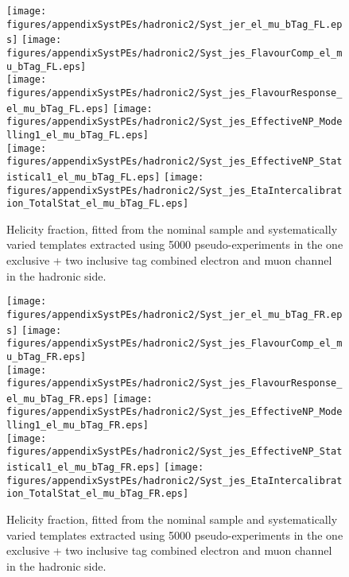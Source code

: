 \begin{figure}[!hb]
\begin{center}
        \texttt{[image: figures/appendixSystPEs/hadronic2/Syst\_jer\_el\_mu\_bTag\_FL.eps]}
        \texttt{[image: figures/appendixSystPEs/hadronic2/Syst\_jes\_FlavourComp\_el\_mu\_bTag\_FL.eps]}\\
        \texttt{[image: figures/appendixSystPEs/hadronic2/Syst\_jes\_FlavourResponse\_el\_mu\_bTag\_FL.eps]}
        \texttt{[image: figures/appendixSystPEs/hadronic2/Syst\_jes\_EffectiveNP\_Modelling1\_el\_mu\_bTag\_FL.eps]}\\
         \texttt{[image: figures/appendixSystPEs/hadronic2/Syst\_jes\_EffectiveNP\_Statistical1\_el\_mu\_bTag\_FL.eps]}
        \texttt{[image: figures/appendixSystPEs/hadronic2/Syst\_jes\_EtaIntercalibration\_TotalStat\_el\_mu\_bTag\_FL.eps]}
\caption{Helicity fraction, \fl fitted from the nominal \ttbar sample and systematically varied templates extracted using 5000 pseudo-experiments in the one exclusive + two inclusive \bt tag combined electron and muon channel in the hadronic side. }
\label{fig:systematicVar_lep_fL_elmu2incl_JERJES_1}
\end{center}
\end{figure}


\begin{figure}[!hb]
\begin{center}
        \texttt{[image: figures/appendixSystPEs/hadronic2/Syst\_jer\_el\_mu\_bTag\_FR.eps]}
        \texttt{[image: figures/appendixSystPEs/hadronic2/Syst\_jes\_FlavourComp\_el\_mu\_bTag\_FR.eps]}\\
        \texttt{[image: figures/appendixSystPEs/hadronic2/Syst\_jes\_FlavourResponse\_el\_mu\_bTag\_FR.eps]}
        \texttt{[image: figures/appendixSystPEs/hadronic2/Syst\_jes\_EffectiveNP\_Modelling1\_el\_mu\_bTag\_FR.eps]}\\
        \texttt{[image: figures/appendixSystPEs/hadronic2/Syst\_jes\_EffectiveNP\_Statistical1\_el\_mu\_bTag\_FR.eps]}
        \texttt{[image: figures/appendixSystPEs/hadronic2/Syst\_jes\_EtaIntercalibration\_TotalStat\_el\_mu\_bTag\_FR.eps]}
 
\caption{Helicity fraction, \fr fitted from the nominal \ttbar sample and systematically varied templates extracted using 5000 pseudo-experiments in the one exclusive + two inclusive \bt tag combined electron and muon channel in the hadronic side. }
\label{fig:systematicVar_lep_fR_elmu2incl_JERJES_1}
\end{center}
\end{figure}


